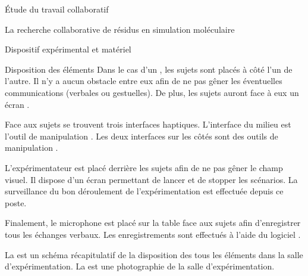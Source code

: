 \documentclass[myfrancais]{mythesis}
\begin{document}
\begin{mypart}{Étude du travail collaboratif}
\begin{mychapter}{La recherche collaborative de résidus en simulation moléculaire}
\begin{mysection}{Dispositif expérimental et matériel}
\begin{mysubsection}{Disposition des éléments}
					Dans le cas d'un , les sujets sont placés à côté l'un de l'autre.
					Il n'y a aucun obstacle entre eux afin de ne pas gêner les éventuelles communications (verbales ou gestuelles).
					De plus, les sujets auront face à eux un écran \myLCD.

					Face aux sujets se trouvent trois interfaces haptiques.
					L'interface du milieu est l'outil de manipulation .
					Les deux interfaces sur les côtés sont des outils de manipulation  .

					L'expérimentateur est placé derrière les sujets afin de ne pas gêner le champ visuel.
					Il dispose d'un écran permettant de lancer et de stopper les scénarios.
					La surveillance du bon déroulement de l'expérimentation est effectuée depuis ce poste.

					Finalement, le microphone est placé sur la table face aux sujets afin d'enregistrer tous les échanges verbaux.
					Les enregistrements sont effectués à l'aide du logiciel \myAudacity.

					La  est un schéma récapitulatif de la disposition des tous les éléments dans la salle d'expérimentation.
					La  est une photographie de la salle d'expérimentation.


\end{mysubsection}
\end{mysection}
\end{mychapter}
\end{mypart}
\end{document}
